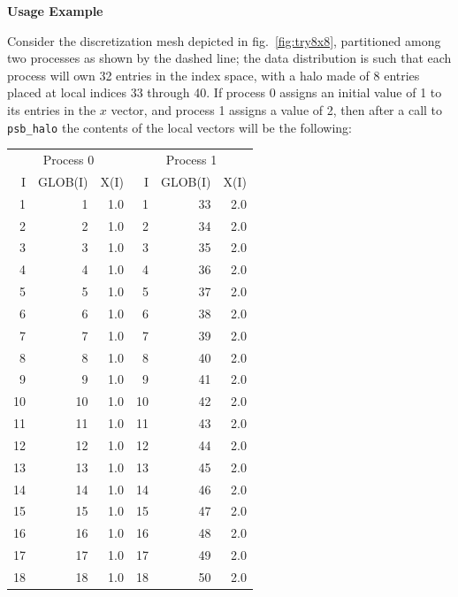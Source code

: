 {\par\noindent\large\bfseries Usage Example}
Consider the discretization mesh depicted in fig.~\ref{fig:try8x8},
partitioned among two processes as shown by the dashed line; the data
distribution is such that each process will own 32 entries in the
index space, with a halo made of 8 entries placed at local indices 33
through 40. If process 0 assigns an initial value of 1 to its entries
in the $x$ vector, and process 1 assigns a value of 2, then after a
call to \verb|psb_halo| the contents of the local vectors will be the
following: 
\begin{table}
\begin{center}
\small\begin{tabular}{rrr@{\hspace{6\tabcolsep}}rrr}
\multicolumn{3}{c}{Process  0}&
\multicolumn{3}{c}{Process  1}\\
  I  &   GLOB(I) & X(I)  &   I & GLOB(I) & X(I) \\
  1   &    1  &  1.0   &   1  &  33  &   2.0 \\ 
  2   &    2  &  1.0   &   2  &  34  &   2.0 \\
  3   &    3  &  1.0   &   3  &  35  &   2.0 \\
  4   &    4  &  1.0   &   4  &  36  &   2.0 \\
  5   &    5  &  1.0   &   5  &  37  &   2.0 \\
  6   &    6  &  1.0   &   6  &  38  &   2.0 \\
  7   &    7  &  1.0   &   7  &  39  &   2.0 \\
  8   &    8  &  1.0   &   8  &  40  &   2.0 \\
  9   &    9  &  1.0   &   9  &  41  &   2.0 \\
 10   &   10  &  1.0   &  10  &  42  &   2.0 \\
 11   &   11  &  1.0   &  11  &  43  &   2.0 \\
 12   &   12  &  1.0   &  12  &  44  &   2.0 \\
 13   &   13  &  1.0   &  13  &  45  &   2.0 \\
 14   &   14  &  1.0   &  14  &  46  &   2.0 \\
 15   &   15  &  1.0   &  15  &  47  &   2.0 \\
 16   &   16  &  1.0   &  16  &  48  &   2.0 \\
 17   &   17  &  1.0   &  17  &  49  &   2.0 \\
 18   &   18  &  1.0   &  18  &  50  &   2.0 \\

\end{tabular}
\end{center}
\end{table}
